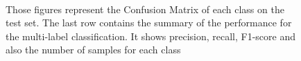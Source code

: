 \begin{figure}
{}\\
\caption[Confusion matrices of classes predicted with Inception\_v3]{Those figures represent the Confusion Matrix of each class on the test set. The last row contains the summary of the performance for the multi-label classification. It shows precision, recall, F1-score and also the number of samples for each class}
\label{fig:cm_optim}
\end{figure}